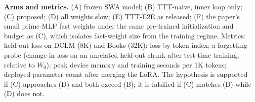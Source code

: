 \documentclass[10pt]{article}
\begin{document}
\textbf{Arms and metrics.} (A) frozen SWA model; (B) TTT-naive, inner loop only; (C) proposed; (D) all weights slow; (E) TTT-E2E as released; (F) the paper's small prime-MLP fast weights under the same pre-trained initialization and budget as (C), which isolates fast-weight size from the training regime. Metrics: held-out loss on DCLM (8K) and Books (32K); loss by token index; a forgetting probe (change in loss on an unrelated held-out chunk after test-time training, relative to $W_0$); peak device memory and training seconds per 1K tokens; deployed parameter count after merging the LoRA. The hypothesis is supported if (C) approaches (D) and both exceed (B); it is falsified if (C) matches (B) while (D) does not.



\end{document}

